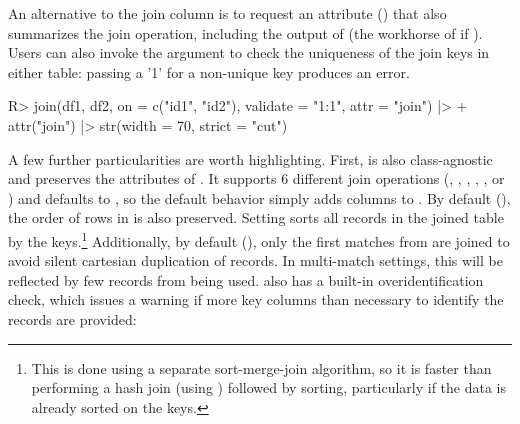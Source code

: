 \documentclass[article]{jss}
\newcommand{\fct}[1]{\code{#1()}}
\begin{document}
%
An alternative to the join column is to request an attribute () that also summarizes the join operation, including the output of \fct{fmatch} (the workhorse of \fct{join} if ). Users can also invoke the  argument to check the uniqueness of the join keys in either table: passing a '1' for a non-unique key produces an error.
%
\begin{Schunk}
\begin{Sinput}
R> join(df1, df2, on = c("id1", "id2"), validate = "1:1", attr = "join") |>
+    attr("join") |> str(width = 70, strict = "cut")
\end{Sinput}
\end{Schunk}
%
A few further particularities are worth highlighting. First,  is also class-agnostic and preserves the attributes of . It supports 6 different join operations (, , , , , or ) and defaults to , so the default behavior simply adds columns to . By default (), the order of rows in  is also preserved. Setting  sorts all records in the joined table by the keys.\footnote{This is done using a separate sort-merge-join algorithm, so it is faster than performing a hash join (using \fct{fmatch}) followed by sorting, particularly if the data is already sorted on the keys. } Additionally, by default (), only the first matches from  are joined to avoid silent cartesian duplication of records. In multi-match settings, this will be reflected by few records from  being used. \fct{fmatch} also has a built-in overidentification check, which issues a warning if more key columns than necessary to identify the records are provided:
%
\end{document}
